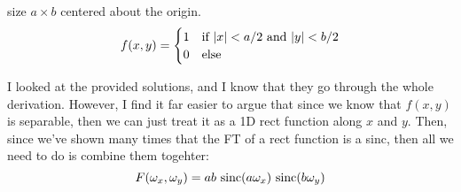 \documentclass[10pt]{article}
\begin{document}
\begin{enumerate}[label=\alph*)]
					size \( a \times b \) centered about the origin.
					\[
					f(x, y) = \begin{cases}
						1 & \text{if \( |x| < a / 2 \) and \( |y| < b / 2 \)}\\
						0 & \text{else}
					\end{cases}
					\] 
					\begin{solution}
						I looked at the provided solutions, and I know that they go through the whole derivation. 
						However, I find it far easier to argue that since we know that \( f(x, y) \) is 
						separable, then we can just treat it as a 1D rect function along  \( x \) and \( y \). 
						Then, since we've shown many times that the FT of a rect function is a sinc, then all 
						we need to do is combine them togehter:
						\[
						F(\omega_x, \omega_y) = ab \ \sinc(a \omega_x) \ \sinc(b \omega_y)
						\] 
					\end{solution}
	\end{enumerate}
	\pagebreak
\end{document}
